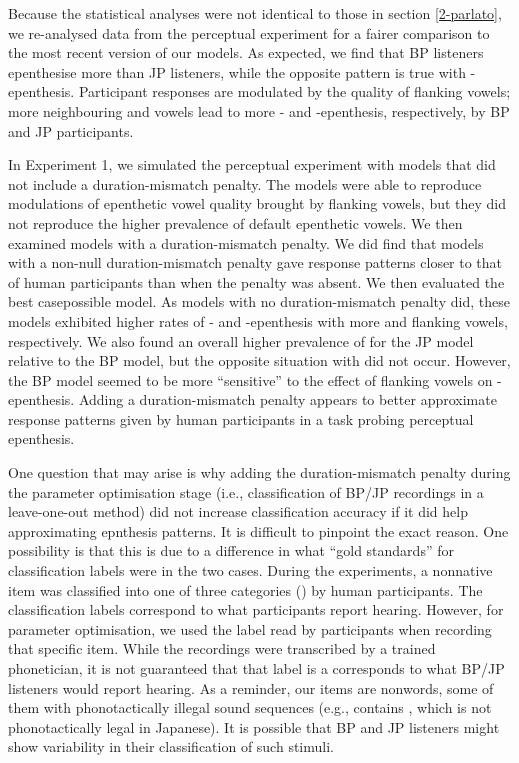 Because the statistical analyses were not identical to those in section \ref{2-parlato}, we re-analysed data from the perceptual experiment for a fairer comparison to the most recent version of our models. As expected, we find that BP listeners epenthesise more  than JP listeners, while the opposite pattern is true with -epenthesis. Participant responses are modulated by the quality of flanking vowels; more neighbouring  and  vowels lead to more - and -epenthesis, respectively, by BP and JP participants.

In Experiment 1, we simulated the perceptual experiment with models that did not include a duration-mismatch penalty. The models were able to reproduce modulations of epenthetic vowel quality brought by flanking vowels, but they did not reproduce the higher prevalence of default epenthetic vowels.
We then examined models with a duration-mismatch penalty. We did find that models with a non-null duration-mismatch penalty gave response patterns closer to that of human participants than when the penalty was absent. We then evaluated the best casepossible model. As models with no duration-mismatch penalty did, these models exhibited higher rates of - and -epenthesis with more  and  flanking vowels, respectively. We also found an overall higher prevalence of  for the JP model relative to the BP model, but the opposite situation with  did not occur. However, the BP model seemed to be more ``sensitive'' to the effect of  flanking vowels on -epenthesis. Adding a duration-mismatch penalty appears to better approximate response patterns given by human participants in a task probing perceptual epenthesis.  

One question that may arise is why adding the duration-mismatch penalty during the parameter optimisation stage (i.e., classification of BP/JP recordings in a leave-one-out method) did not increase classification accuracy if it did help approximating epnthesis patterns. It is difficult to pinpoint the exact reason. One possibility is that this is due to a difference in what ``gold standards'' for classification labels were in the two cases. During the experiments, a nonnative item was classified into one of three categories () by human participants. The classification labels correspond to what participants report hearing. However, for parameter optimisation, we used the label read by participants when recording that specific item. While the recordings were transcribed by a trained phonetician, it is not guaranteed that that label is a corresponds to what BP/JP listeners would report hearing. As a reminder, our items are nonwords, some of them with phonotactically illegal sound sequences (e.g.,  contains , which is not phonotactically legal in Japanese). It is possible that BP and JP listeners might show variability in their classification of such stimuli.    

